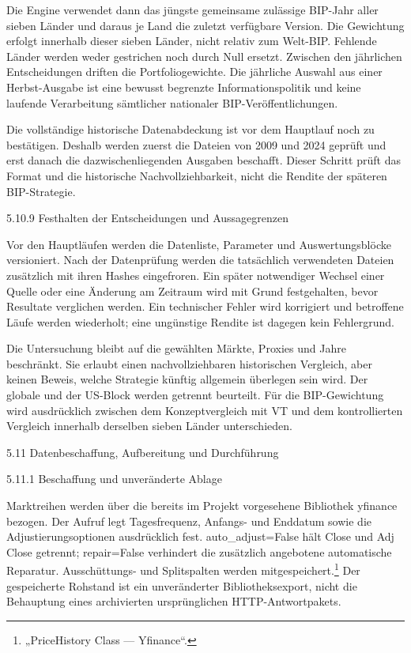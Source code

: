 \documentclass[
  ngerman,
  a4paper,
  DIV=11,
  oneside]{scrreprt}
\begin{document}
Die Engine verwendet dann das jüngste gemeinsame zulässige BIP-Jahr
aller sieben Länder und daraus je Land die zuletzt verfügbare Version.
Die Gewichtung erfolgt innerhalb dieser sieben Länder, nicht relativ zum
Welt-BIP. Fehlende Länder werden weder gestrichen noch durch Null
ersetzt. Zwischen den jährlichen Entscheidungen driften die
Portfoliogewichte. Die jährliche Auswahl aus einer Herbst-Ausgabe ist
eine bewusst begrenzte Informationspolitik und keine laufende
Verarbeitung sämtlicher nationaler BIP-Veröffentlichungen.

Die vollständige historische Datenabdeckung ist vor dem Hauptlauf noch
zu bestätigen. Deshalb werden zuerst die Dateien von 2009 und 2024
geprüft und erst danach die dazwischenliegenden Ausgaben beschafft.
Dieser Schritt prüft das Format und die historische Nachvollziehbarkeit,
nicht die Rendite der späteren BIP-Strategie.

5.10.9 Festhalten der Entscheidungen und Aussagegrenzen

Vor den Hauptläufen werden die Datenliste, Parameter und
Auswertungsblöcke versioniert. Nach der Datenprüfung werden die
tatsächlich verwendeten Dateien zusätzlich mit ihren Hashes eingefroren.
Ein später notwendiger Wechsel einer Quelle oder eine Änderung am
Zeitraum wird mit Grund festgehalten, bevor Resultate verglichen werden.
Ein technischer Fehler wird korrigiert und betroffene Läufe werden
wiederholt; eine ungünstige Rendite ist dagegen kein Fehlergrund.

Die Untersuchung bleibt auf die gewählten Märkte, Proxies und Jahre
beschränkt. Sie erlaubt einen nachvollziehbaren historischen Vergleich,
aber keinen Beweis, welche Strategie künftig allgemein überlegen sein
wird. Der globale und der US-Block werden getrennt beurteilt. Für die
BIP-Gewichtung wird ausdrücklich zwischen dem Konzeptvergleich mit VT
und dem kontrollierten Vergleich innerhalb derselben sieben Länder
unterschieden.

5.11 Datenbeschaffung, Aufbereitung und Durchführung

5.11.1 Beschaffung und unveränderte Ablage

Marktreihen werden über die bereits im Projekt vorgesehene Bibliothek
yfinance bezogen. Der Aufruf legt Tagesfrequenz, Anfangs- und Enddatum
sowie die Adjustierungsoptionen ausdrücklich fest. auto\_adjust=False
hält Close und Adj Close getrennt; repair=False verhindert die
zusätzlich angebotene automatische Reparatur. Ausschüttungs- und
Splitspalten werden mitgespeichert.\footnote{{„{PriceHistory} Class ---
  Yfinance``}.} Der gespeicherte Rohstand ist ein unveränderter
Bibliotheksexport, nicht die Behauptung eines archivierten
ursprünglichen HTTP-Antwortpakets.
\end{document}
